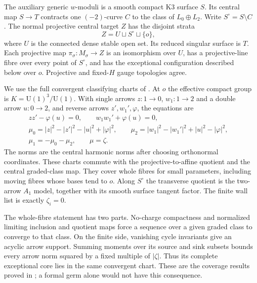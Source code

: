 The auxiliary generic $w$-moduli is a smooth compact K3 surface $S$.
Its central map $S\to T$ contracts one $(-2)$-curve $C$ to the
class of $L_0\oplus L_2$. Write $S^\circ=S\setminus C$.
The normal projective central target $Z$ has the disjoint strata
\begin{equation}\label{eq:strata}
 Z=U\sqcup S^\circ\sqcup\{o\},
\end{equation}
where $U$ is the connected dense stable open set. Its reduced singular
surface is $T$. Each projective map $\pi_\sigma:M_\sigma\to Z$
is an isomorphism over $U$, has a projective-line fibre over every
point of $S^\circ$, and has the exceptional configuration described
below over $o$. Projective and fixed-$H$ gauge topologies agree.

We use the full convergent classifying charts of
\cite[\S\S2,4]{wuebben17}. At $o$ the effective compact group is
$K=\mathrm U(1)^3/\mathrm U(1)$. With single arrows
$z:1\to0$, $w_1:1\to2$ and a double arrow $u:0\to2$, and
reverse arrows $z',w_1',\varphi$, the equations are
\begin{equation}\label{eq:quiver}
 \begin{gathered}
 zz'-\varphi(u)=0,\qquad w_1w_1'+\varphi(u)=0,\\
 \mu_0=|z|^2-|z'|^2-|u|^2+|\varphi|^2,\qquad
 \mu_2=|w_1|^2-|w_1'|^2+|u|^2-|\varphi|^2,\\
 \mu_1=-\mu_0-\mu_2,\qquad \mu=\zeta.
 \end{gathered}
\end{equation}
The norms are the central harmonic norms after choosing orthonormal
coordinates. These charts commute with the projective-to-affine
quotient and the central graded-class map. They cover whole fibres
for small parameters, including moving fibres whose bases tend to
$o$. Along $S^\circ$ the transverse quotient is the two-arrow
$A_1$ model, together with its smooth surface tangent factor.
The finite wall list is exactly $\zeta_i=0$.

The whole-fibre statement has two parts. No-charge compactness and
normalized limiting inclusion and quotient maps force a sequence
over a given graded class to converge to that class. On the finite
side, vanishing cycle invariants give an acyclic arrow support.
Summing moments over its source and sink subsets bounds every arrow
norm squared by a fixed multiple of $|\zeta|$. Thus its complete
exceptional core lies in the same convergent chart. These are the
coverage results proved in \cite[\S4.4]{wuebben17}; a formal germ
alone would not have this consequence.

